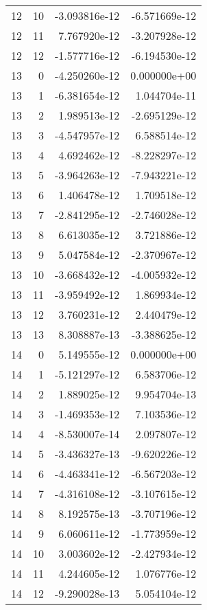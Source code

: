 \begin{tabular}{rrrr}
  12 &   10 & -3.093816e-12 & -6.571669e-12 \\
  12 &   11 &  7.767920e-12 & -3.207928e-12 \\
  12 &   12 & -1.577716e-12 & -6.194530e-12 \\
  13 &    0 & -4.250260e-12 &  0.000000e+00 \\
  13 &    1 & -6.381654e-12 &  1.044704e-11 \\
  13 &    2 &  1.989513e-12 & -2.695129e-12 \\
  13 &    3 & -4.547957e-12 &  6.588514e-12 \\
  13 &    4 &  4.692462e-12 & -8.228297e-12 \\
  13 &    5 & -3.964263e-12 & -7.943221e-12 \\
  13 &    6 &  1.406478e-12 &  1.709518e-12 \\
  13 &    7 & -2.841295e-12 & -2.746028e-12 \\
  13 &    8 &  6.613035e-12 &  3.721886e-12 \\
  13 &    9 &  5.047584e-12 & -2.370967e-12 \\
  13 &   10 & -3.668432e-12 & -4.005932e-12 \\
  13 &   11 & -3.959492e-12 &  1.869934e-12 \\
  13 &   12 &  3.760231e-12 &  2.440479e-12 \\
  13 &   13 &  8.308887e-13 & -3.388625e-12 \\
  14 &    0 &  5.149555e-12 &  0.000000e+00 \\
  14 &    1 & -5.121297e-12 &  6.583706e-12 \\
  14 &    2 &  1.889025e-12 &  9.954704e-13 \\
  14 &    3 & -1.469353e-12 &  7.103536e-12 \\
  14 &    4 & -8.530007e-14 &  2.097807e-12 \\
  14 &    5 & -3.436327e-13 & -9.620226e-12 \\
  14 &    6 & -4.463341e-12 & -6.567203e-12 \\
  14 &    7 & -4.316108e-12 & -3.107615e-12 \\
  14 &    8 &  8.192575e-13 & -3.707196e-12 \\
  14 &    9 &  6.060611e-12 & -1.773959e-12 \\
  14 &   10 &  3.003602e-12 & -2.427934e-12 \\
  14 &   11 &  4.244605e-12 &  1.076776e-12 \\
  14 &   12 & -9.290028e-13 &  5.054104e-12 \\

\end{tabular}

